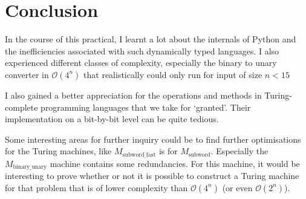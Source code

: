 \section{Conclusion}

In the course of this practical, I learnt a lot about the internals of Python and the inefficiencies associated with such dynamically typed languages. 
I also experienced different classes of complexity, especially the binary to unary converter in $\mathcal{O}(4^n)$ that realistically could only run for input of size $n<15$

I also gained a better appreciation for the operations and methods in Turing-complete programming languages that we take for `granted'. Their implementation on a bit-by-bit level can be quite tedious.

Some interesting areas for further inquiry could be to find further optimisations for the Turing machines, like $M_\text{subword\_fast}$ is for $M_\text{subword}$. Especially the $M_\text{binary\_unary}$ machine contains some redundancies. For this machine, it would be interesting to prove whether or not it is possible to construct a Turing machine for that problem that is of lower complexity than $\mathcal{O}(4^n)$ (or even $\mathcal{O}(2^n)$).
